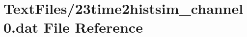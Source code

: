 \hypertarget{23time2histsim__channel0_8dat}{}\section{Text\+Files/23time2histsim\+\_\+channel0.dat File Reference}
\label{23time2histsim__channel0_8dat}
